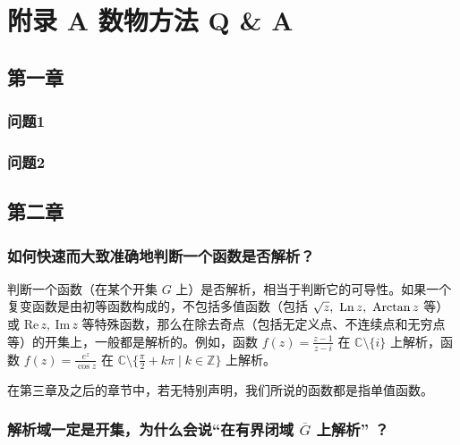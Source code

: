 \documentclass[UTF8]{report}
\def\Im{\mathrm{Im\,}}
\def\Re{\mathrm{Re\,}}
\def\Ln{\mathrm{Ln\,}}
\def\Z{\mathbb{Z}}
\def\C{\mathbb{C}}
\theoremstyle{MyLineTheoremStyle} %
\theoremstyle{MyBlockTheoremStyle} %
\theoremstyle{MySubsubsectionStyle} %
\begin{document}
\chapter*{附录 A\hspace*{20pt}  数物方法 Q \& A}\setcounter{chapter}{1} 
\setcounter{equation}{0}    %
\thispagestyle{fancy} 
\setcounter{section}{0}   
\renewcommand\thesection{A.\arabic{section}}   
\renewcommand{\thefigure}{A.\arabic{figure}} 
\renewcommand{\thetable}{A.\arabic{table}}

\section{第一章}

\subsection{问题1}



\subsection{问题2}

\section{第二章}


\subsection{如何快速而大致准确地判断一个函数是否解析？}

判断一个函数（在某个开集 $G$ 上）是否解析，相当于判断它的可导性。如果一个复变函数是由初等函数构成的，不包括多值函数（包括 $\sqrt{z},\ \Ln z,\ \text{Arctan\,} z$ 等）或 $\Re z,\ \Im z$ 等特殊函数，那么在除去奇点（包括无定义点、不连续点和无穷点等）的开集上，一般都是解析的。例如，函数 $f(z) = \frac{z - 1}{z - i}$ 在 $\C \setminus \{i\}$ 上解析，函数 $f(z) = \frac{e^z}{\cos z}$ 在 $\C \setminus \{\frac{\pi}{2} + k\pi \mid k \in \Z \}$ 上解析。

在第三章及之后的章节中，若无特别声明，我们所说的函数都是指单值函数。

\subsection{解析域一定是开集，为什么会说“在有界闭域 $\overline{G} $ 上解析” ？}\label{在闭域上解析}
\end{document}

